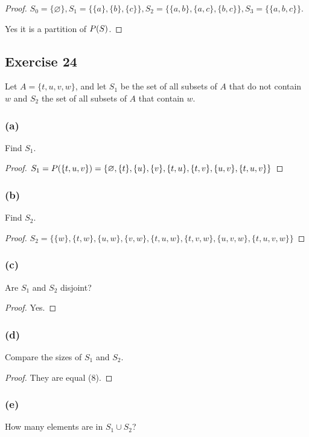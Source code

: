 \documentclass[14pt]{extarticle}
\let\mathscr\relax
\newcommand{\ps}{\mathscr{P}}
\newcommand{\es}{\varnothing}
\begin{document}
\begin{proof}
  \(S_0 = \{\es\}, S_1 = \{\{a\}, \{b\}, \{c\}\}, S_2 = \{\{a,b\}, \{a,c\}, \{b,c\}\}, S_3 = \{\{a,b,c\}\}\).

  Yes it is a partition of $\ps(S)$.
\end{proof}

\subsection{Exercise 24}
Let \(A = \{t, u, v, w\}\), and let $S_1$ be the set of all subsets of $A$ that do not contain $w$ and $S_2$ the set of all subsets of $A$ that contain $w$.

\subsubsection{(a)}
Find $S_1$.

\begin{proof}
  \(S_1 = \ps(\{t,u,v\}) = \{\es, \{t\}, \{u\}, \{v\}, \{t,u\}, \{t,v\}, \{u,v\}, \{t,u,v\}\}\)
\end{proof}

\subsubsection{(b)}
Find $S_2$.

\begin{proof}
  \(S_2 = \{\{w\}, \{t,w\}, \{u,w\}, \{v,w\}, \{t,u,w\}, \{t,v,w\}, \{u,v,w\}, \{t,u,v,w\}\}\)
\end{proof}

\subsubsection{(c)}
Are $S_1$ and $S_2$ disjoint?

\begin{proof}
  Yes.
\end{proof}

\subsubsection{(d)}
Compare the sizes of $S_1$ and $S_2$.

\begin{proof}
  They are equal (8).
\end{proof}

\subsubsection{(e)}
How many elements are in \(S_1 \cup S_2\)?
\end{document}
